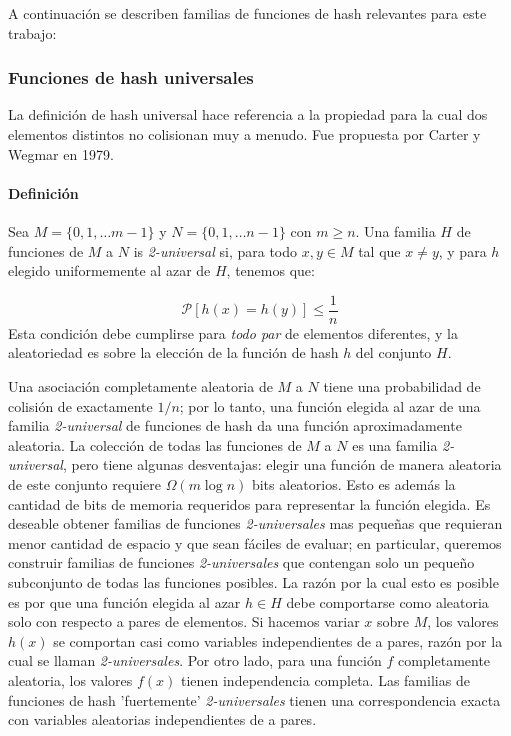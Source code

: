\documentclass[a4paper,12pt, oneside]{article}
\begin{document}
A continuación se describen familias de funciones de hash relevantes para este trabajo:
\subsubsection{Funciones de hash universales}\label{sec:funciones_de_hash_universales}
La definición de hash universal hace referencia a la propiedad para la cual dos elementos distintos no colisionan muy a menudo. Fue propuesta por Carter y Wegmar en 1979\cite{WEGMAN1981265}.


\paragraph{Definición} Sea $M = \{0, 1, \dots m-1 \}$ y $N = \{0, 1, \dots n-1 \}$ con $m \geq n$. Una familia $H$ de funciones de $M$ a $N$ is \textit{2-universal} si, para todo $x,y \in M$ tal que $x\neq y$, y para $h$ elegido uniformemente al azar de $H$, tenemos que: 

\begin{equation}
	\mathcal{P}[h(x) = h(y)] \leq \frac{1}{n}
\end{equation}
Esta condición debe cumplirse para \textit{todo par} de elementos diferentes, y la aleatoriedad es sobre la elección de la función de hash $h$ del conjunto $H$.

Una asociación completamente aleatoria de $M$ a $N$ tiene una probabilidad de colisión de exactamente $1/n$; por lo tanto, una función elegida al azar de una familia \textit{2-universal} de funciones de hash da una función aproximadamente aleatoria. La colección de todas las funciones de $M$ a $N$ es una familia \textit{2-universal}, pero tiene algunas desventajas: elegir una función de manera aleatoria de este conjunto requiere $\Omega(m \log n)$ bits aleatorios. Esto es además la cantidad de bits de memoria requeridos para representar la función elegida. Es deseable obtener familias de funciones \textit{2-universales} mas pequeñas que requieran menor cantidad de espacio y que sean fáciles de evaluar; en particular, queremos construir familias de funciones \textit{2-universales} que contengan solo un pequeño subconjunto de todas las funciones posibles. La razón por la cual esto es posible es por que una función elegida al azar $h \in H$ debe comportarse como aleatoria solo con respecto a pares de elementos. Si hacemos variar $x$ sobre $M$, los valores $h(x)$ se comportan casi como variables independientes de a pares, razón por la cual se llaman \textit{2-universales}. Por otro lado, para una función $f$ completamente aleatoria, los valores $f(x)$ tienen independencia completa. Las familias de funciones de hash 'fuertemente' \textit{2-universales} tienen una correspondencia exacta con variables aleatorias independientes de a pares.
\end{document}
